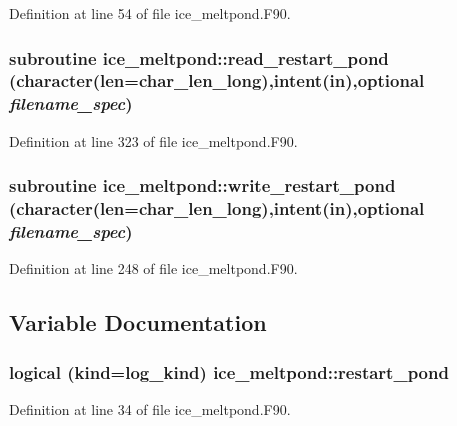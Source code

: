 Definition at line 54 of file ice\_\-meltpond.F90.\hypertarget{namespaceice__meltpond_abc1500e180d1775374ecff960c8ec825}{
\subsubsection[{read\_\-restart\_\-pond}]{\setlength{\rightskip}{0pt plus 5cm}subroutine ice\_\-meltpond::read\_\-restart\_\-pond (character(len=char\_\-len\_\-long),intent(in),optional {\em filename\_\-spec})}}
\label{namespaceice__meltpond_abc1500e180d1775374ecff960c8ec825}


Definition at line 323 of file ice\_\-meltpond.F90.\hypertarget{namespaceice__meltpond_a18dd3b2ba6582ac028a021de32f0e014}{
\subsubsection[{write\_\-restart\_\-pond}]{\setlength{\rightskip}{0pt plus 5cm}subroutine ice\_\-meltpond::write\_\-restart\_\-pond (character(len=char\_\-len\_\-long),intent(in),optional {\em filename\_\-spec})}}
\label{namespaceice__meltpond_a18dd3b2ba6582ac028a021de32f0e014}


Definition at line 248 of file ice\_\-meltpond.F90.

\subsection{Variable Documentation}
\hypertarget{namespaceice__meltpond_a5f576379fa33029c540bd3b3474f45c1}{
\subsubsection[{restart\_\-pond}]{\setlength{\rightskip}{0pt plus 5cm}logical (kind=log\_\-kind) {\bf ice\_\-meltpond::restart\_\-pond}}}
\label{namespaceice__meltpond_a5f576379fa33029c540bd3b3474f45c1}


Definition at line 34 of file ice\_\-meltpond.F90.